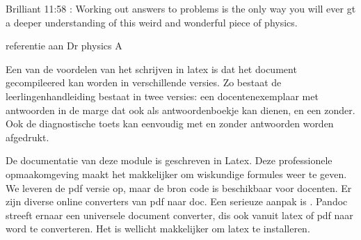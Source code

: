 \documentclass[../../main.tex]{subfiles}
\begin{document}
Brilliant 11:58 : Working out answers to problems is the only way you will ever gt a deeper understanding of this weird and wonderful piece of physics.

referentie aan Dr physics A


Een van de voordelen van het schrijven in latex is dat het document gecompileered kan worden in verschillende versies. Zo bestaat de leerlingenhandleiding bestaat in twee versies: een docentenexemplaar  met antwoorden in de marge dat ook als antwoordenboekje kan dienen,   en een zonder. Ook de diagnostische toets kan eenvoudig met en zonder antwoorden worden afgedrukt.

De documentatie van deze module is geschreven in Latex. Deze professionele opmaakomgeving maakt het makkelijker om wiskundige formules weer te geven. 
We leveren de pdf versie op, maar de bron code is beschikbaar voor docenten.
Er zijn diverse online converters van pdf naar doc. 
Een serieuze aanpak is . Pandoc streeft ernaar een universele document converter, dis ook  vanuit latex of pdf naar word te converteren. Het is wellicht makkelijker om latex te installeren.
\fi%
\end{document}
